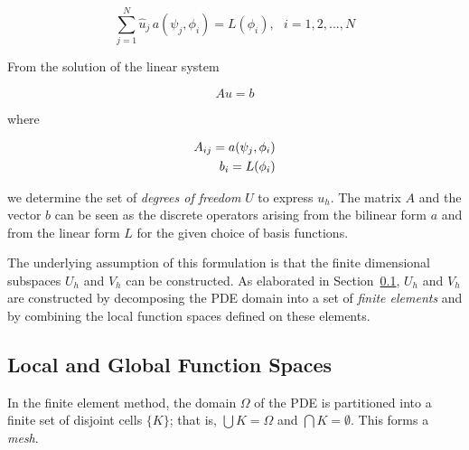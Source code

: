 \begin{equation}
\sum_{j=1}^N \hat{u}_j \, a(\psi_j, \phi_i) = L(\phi_i),\ \ \ i=1,2,...,N
\end{equation}

From the solution of the linear system

\begin{equation}
\label{sec:bkg:eq:lin-sys}
Au = b
\end{equation}

where

\begin{equation}
\label{sec:bkg:eq:disc-op}
\centering
\begin{split}
A_{ij} = a(\psi_j,\phi_i) \\
b_i = L(\phi_i)
\end{split}
\end{equation}

we determine the set of {\em degrees of freedom} $U$ to express $u_h$. The matrix $A$ and the vector $b$ can be seen as the discrete operators arising from the bilinear form $a$ and from the linear form $L$ for the given choice of basis functions.

The underlying assumption of this formulation is that the finite dimensional subspaces $U_h$ and $V_h$ can be constructed. As elaborated in Section~\ref{sec:bkg:finite-elements}, $U_h$ and $V_h$ are constructed by decomposing the PDE domain into a set of {\em finite elements} and by combining the local function spaces defined on these elements. 



\subsection{Local and Global Function Spaces}
\label{sec:bkg:finite-elements}
In the finite element method, the domain $\Omega$ of the PDE is partitioned into a finite set of disjoint cells $\lbrace K \rbrace$; that is, $\bigcup K = \Omega$ and $\bigcap K = \emptyset$. This forms a {\em mesh}. 

